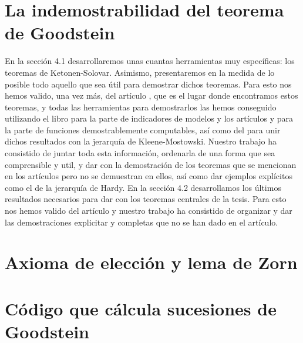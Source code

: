 \documentclass[12pt,a4paper]{book}
\numberwithin{thm}{chapter}
\theoremstyle{definition}
\begin{document}
\chapter{La indemostrabilidad del teorema de Goodstein}
En la sección 4.1 desarrollaremos unas cuantas herramientas muy específicas: los teoremas de Ketonen-Solovar. Asimismo, presentaremos en la medida de lo posible todo aquello que sea útil para demostrar dichos teoremas.
Para esto nos hemos valido, una vez más, del artículo {\cite{Goodstein}}, que es el lugar donde encontramos estos teoremas, y todas las herramientas para demostrarlos las hemos conseguido utilizando el libro {\cite[Capítulo 14]{indicators}} para la parte de indicadores de modelos y los artículos {\cite{KetonenSolovay}} y {\cite{gerarquias}} para la parte de funciones demostrablemente computables, así como del {\cite{demoscomp}} para unir dichos resultados con la jerarquía de Kleene-Mostowski.
Nuestro trabajo ha consistido de juntar toda esta información, ordenarla de una forma que sea comprensible y util, y dar con la demostración de los teoremas que se mencionan en los artículos pero no se demuestran en ellos, así como dar ejemplos explícitos como el de la jerarquía de Hardy.
En la sección 4.2 desarrollamos los últimos resultados necesarios para dar con los teoremas centrales de la tesis. Para esto nos hemos valido del artículo {\cite{Goodstein}} y nuestro trabajo ha consistido de organizar y dar las demostraciones explicitar y completas que no se han dado en el artículo.





\appendix
\chapter{Axioma de elección y lema de Zorn}



\chapter{Código que cálcula sucesiones de Goodstein}


\end{document}
